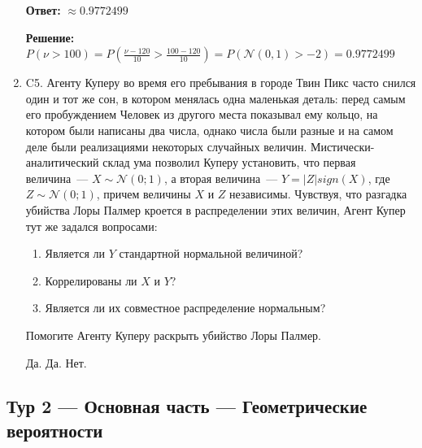 \documentclass[12pt]{article}
\def \P{P}
\def \cN{\mathcal{N}}
\newenvironment{problem}{}{}
\newenvironment{sol}{}{} %
\begin{document}
\begin{enumerate}
\begin{problem}
\begin{sol}
\textbf{Ответ:} $\approx 0.9772499$ 

\textbf{Решение:} $\P (\nu > 100) = \P\left(\frac{\nu - 120}{10} > \frac{100-120}{10}\right) = \P(\cN(0,1)> -2) = 0.9772499$ 
\end{sol}
\end{problem}

\begin{problem}
\item[C5.] Агенту Куперу во время его пребывания в городе Твин Пикс часто снился один и тот же сон, в котором менялась одна маленькая деталь: перед самым его пробуждением Человек из другого места показывал ему кольцо, на котором были написаны два числа, однако числа были разные и на самом деле были реализациями некоторых случайных величин. Мистически-аналитический склад ума позволил Куперу установить, что первая величина~--- \(X\sim\mathcal{N}(0;1)\), а вторая величина~--- \(Y = |Z|sign(X)\), где \(Z\sim\mathcal{N}(0;1)\), причем величины \(X\) и \(Z\) независимы. Чувствуя, что разгадка убийства Лоры Палмер кроется в распределении этих величин, Агент Купер тут же задался вопросами: 
\begin{enumerate}
\item Является ли \(Y\) стандартной нормальной величиной?
\item Коррелированы ли \(X\) и \(Y\)?
\item Является ли их совместное распределение нормальным?
\end{enumerate}
Помогите Агенту Куперу раскрыть убийство Лоры Палмер.

\begin{sol}
Да. Да. Нет.
\end{sol}
\end{problem}
\end{enumerate}


\newpage
\subsection{Тур 2 — Основная часть — Геометрические вероятности}
\end{document}
